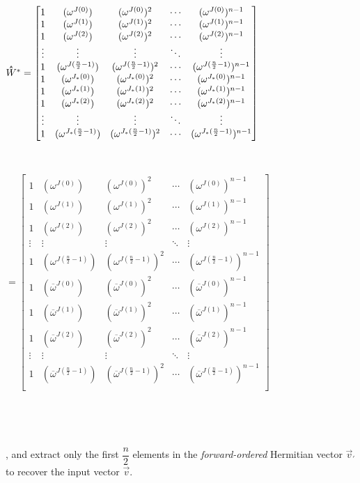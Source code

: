 \begin{tcolorbox}[title={\textbf{\tboxlabel{\ref*{subsec:ckks-encoding-decoding}} CKKS's Encoding and Decoding}}]
\noindent $\hathat{W}^* = \begin{bmatrix}
1 & (\omega^{J(0)}) & (\omega^{J(0)})^2 & \cdots & (\omega^{J(0)})^{n-1}\\
1 & (\omega^{J(1)}) & (\omega^{J(1)})^2 & \cdots & (\omega^{J(1)})^{n-1}\\
1 & (\omega^{J(2)}) & (\omega^{J(2)})^2 & \cdots & (\omega^{J(2)})^{n-1}\\
\vdots & \vdots & \vdots & \ddots & \vdots \\
1 & (\omega^{J(\frac{n}{2}-1)}) & (\omega^{J(\frac{n}{2}-1)})^2 & \cdots & (\omega^{J(\frac{n}{2}-1)})^{n-1}\\
1 & (\omega^{J_*(0)}) & (\omega^{J_*(0)})^2 & \cdots & (\omega^{J_*(0)})^{n-1}\\
1 & (\omega^{J_*(1)}) & (\omega^{J_*(1)})^2 & \cdots & (\omega^{J_*(1)})^{n-1}\\
1 & (\omega^{J_*(2)}) & (\omega^{J_*(2)})^2 & \cdots & (\omega^{J_*(2)})^{n-1}\\
\vdots & \vdots & \vdots & \ddots & \vdots \\
1 & (\omega^{J_*(\frac{n}{2}-1)}) & (\omega^{J_*(\frac{n}{2}-1)})^2 & \cdots & (\omega^{J_*(\frac{n}{2}-1)})^{n-1}\\
\end{bmatrix}$

$ $

\noindent $ = \begin{bmatrix}
1 & (\omega^{J(0)}) & (\omega^{J(0)})^2 & \cdots & (\omega^{J(0)})^{n-1}\\
1 & (\omega^{J(1)}) & (\omega^{J(1)})^2 & \cdots & (\omega^{J(1)})^{n-1}\\
1 & (\omega^{J(2)}) & (\omega^{J(2)})^2 & \cdots & (\omega^{J(2)})^{n-1}\\
\vdots & \vdots & \vdots & \ddots & \vdots \\
1 & (\omega^{J(\frac{n}{2}-1)}) & (\omega^{J(\frac{n}{2}-1)})^2 & \cdots & (\omega^{J(\frac{n}{2}-1)})^{n-1}\\
1 & (\overline\omega^{J(0)}) & (\overline\omega^{J(0)})^2 & \cdots & (\overline\omega^{J(0)})^{n-1}\\
1 & (\overline\omega^{J(1)}) & (\overline\omega^{J(1)})^2 & \cdots & (\overline\omega^{J(1)})^{n-1}\\
1 & (\overline\omega^{J(2)}) & (\overline\omega^{J(2)})^2 & \cdots & (\overline\omega^{J(2)})^{n-1}\\
\vdots & \vdots & \vdots & \ddots & \vdots \\
1 & (\overline\omega^{J(\frac{n}{2}-1)}) & (\overline\omega^{J(\frac{n}{2}-1)})^2 & \cdots & (\overline\omega^{J(\frac{n}{2}-1)})^{n-1}\\
\end{bmatrix}$

$ $

$ $

, and extract only the first $\dfrac{n}{2}$ elements in the \textit{forward-ordered} Hermitian vector $\vec{v}_{'}$ to recover the input vector $\vec{v}$. 

\end{tcolorbox}

